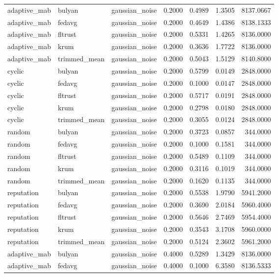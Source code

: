 \begin{tabular}{lllrrrr}
adaptive_mab & bulyan & gaussian_noise & 0.2000 & 0.4989 & 1.3505 & 8137.0667 \\
adaptive_mab & fedavg & gaussian_noise & 0.2000 & 0.4649 & 1.4386 & 8138.1333 \\
adaptive_mab & fltrust & gaussian_noise & 0.2000 & 0.5331 & 1.4265 & 8136.0000 \\
adaptive_mab & krum & gaussian_noise & 0.2000 & 0.3636 & 1.7722 & 8136.0000 \\
adaptive_mab & trimmed_mean & gaussian_noise & 0.2000 & 0.5043 & 1.5129 & 8140.8000 \\
cyclic & bulyan & gaussian_noise & 0.2000 & 0.5799 & 0.0149 & 2848.0000 \\
cyclic & fedavg & gaussian_noise & 0.2000 & 0.1000 & 0.0147 & 2848.0000 \\
cyclic & fltrust & gaussian_noise & 0.2000 & 0.5717 & 0.0191 & 2848.0000 \\
cyclic & krum & gaussian_noise & 0.2000 & 0.2798 & 0.0180 & 2848.0000 \\
cyclic & trimmed_mean & gaussian_noise & 0.2000 & 0.3055 & 0.0124 & 2848.0000 \\
random & bulyan & gaussian_noise & 0.2000 & 0.3723 & 0.0857 & 344.0000 \\
random & fedavg & gaussian_noise & 0.2000 & 0.1000 & 0.1581 & 344.0000 \\
random & fltrust & gaussian_noise & 0.2000 & 0.5489 & 0.1109 & 344.0000 \\
random & krum & gaussian_noise & 0.2000 & 0.3116 & 0.1019 & 344.0000 \\
random & trimmed_mean & gaussian_noise & 0.2000 & 0.1620 & 0.1135 & 344.0000 \\
reputation & bulyan & gaussian_noise & 0.2000 & 0.5538 & 1.9790 & 5941.2000 \\
reputation & fedavg & gaussian_noise & 0.2000 & 0.3690 & 2.0184 & 5960.4000 \\
reputation & fltrust & gaussian_noise & 0.2000 & 0.5646 & 2.7469 & 5954.4000 \\
reputation & krum & gaussian_noise & 0.2000 & 0.3543 & 3.1708 & 5960.0000 \\
reputation & trimmed_mean & gaussian_noise & 0.2000 & 0.5124 & 2.3602 & 5961.2000 \\
adaptive_mab & bulyan & gaussian_noise & 0.4000 & 0.5289 & 1.3429 & 8136.0000 \\
adaptive_mab & fedavg & gaussian_noise & 0.4000 & 0.1000 & 6.3580 & 8136.5333 \\

\end{tabular}
